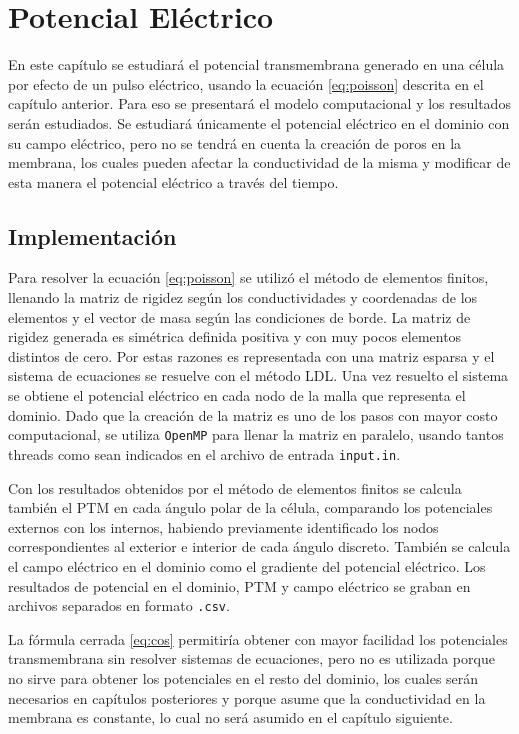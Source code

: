 \chapter{Potencial Eléctrico} \label{chap:itv}

En este capítulo se estudiará el potencial transmembrana generado en una célula por efecto de un pulso eléctrico, usando la ecuación \ref{eq:poisson} descrita en el capítulo anterior. Para eso se presentará el modelo computacional y los resultados serán estudiados. Se estudiará únicamente el potencial eléctrico en el dominio con su campo eléctrico, pero no se tendrá en cuenta la creación de poros en la membrana, los cuales pueden afectar la conductividad de la misma y modificar de esta manera el potencial eléctrico a través del tiempo. 

\section{Implementación}

Para resolver la ecuación \ref{eq:poisson} se utilizó el método de elementos finitos, llenando la matriz de rigidez según los conductividades y coordenadas de los elementos y el vector de masa según las condiciones de borde. La matriz de rigidez generada es simétrica definida positiva y con muy pocos elementos distintos de cero. Por estas razones es representada con una matriz esparsa y el sistema de ecuaciones se resuelve con el método LDL. Una vez resuelto el sistema se obtiene el potencial eléctrico en cada nodo de la malla que representa el dominio. Dado que la creación de la matriz es uno de los pasos con mayor costo computacional, se utiliza \texttt{OpenMP} para llenar la matriz en paralelo, usando tantos threads como sean indicados en el archivo de entrada \texttt{input.in}.

Con los resultados obtenidos por el método de elementos finitos se calcula también el PTM en cada ángulo polar de la célula, comparando los potenciales externos con los internos, habiendo previamente identificado los nodos correspondientes al exterior e interior de cada ángulo discreto. También se calcula el campo eléctrico en el dominio como el gradiente del potencial eléctrico. Los resultados de potencial en el dominio, PTM y campo eléctrico se graban en archivos separados en formato \texttt{.csv}. 

La fórmula cerrada \ref{eq:cos} permitiría obtener con mayor facilidad los potenciales transmembrana sin resolver sistemas de ecuaciones, pero no es utilizada porque no sirve para obtener los potenciales en el resto del dominio, los cuales serán necesarios en capítulos posteriores y porque asume que la conductividad en la membrana es constante, lo cual no será asumido en el capítulo siguiente.

